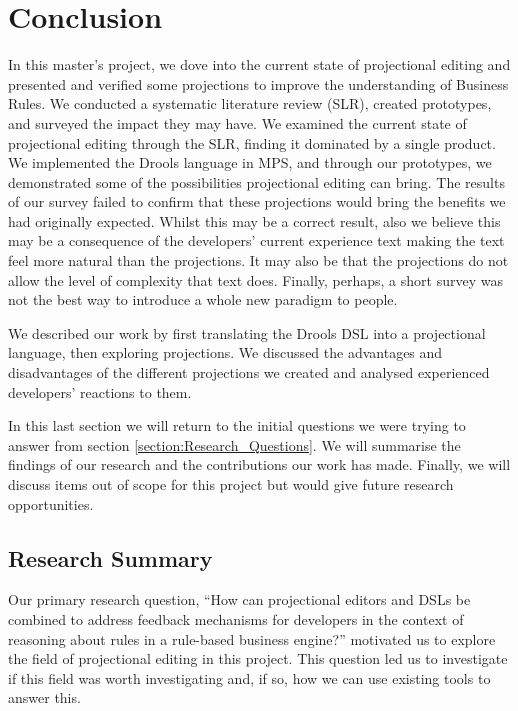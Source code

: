 \chapter{Conclusion}
\label{chapter:Conclusion}

In this master's project, we dove into the current state of projectional editing and presented and verified some projections to improve the understanding of Business Rules.
We conducted a systematic literature review (SLR), created prototypes, and surveyed the impact they may have.
We examined the current state of projectional editing through the SLR, finding it dominated by a single product.
We implemented the Drools language in MPS, and through our prototypes, we demonstrated some of the possibilities projectional editing can bring.
The results of our survey failed to confirm that these projections would bring the benefits we had originally expected.
Whilst this may be a correct result, also we believe this may be a consequence of the developers' current experience text making the text feel more natural than the projections.
It may also be that the projections do not allow the level of complexity that text does.
Finally, perhaps, a short survey was not the best way to introduce a whole new paradigm to people.  

We described our work by first translating the Drools DSL into a projectional language, then exploring projections.
We discussed the advantages and disadvantages of the different projections we created and analysed experienced developers' reactions to them.

In this last section we will return to the initial questions we were trying to answer from section \ref{section:Research_Questions}.
We will summarise the findings of our research and the contributions our work has made.
Finally, we will discuss items out of scope for this project but would give future research opportunities.

\section{Research Summary}
Our primary research question, ``How can projectional editors and DSLs be combined to address feedback mechanisms for developers in the context of reasoning about rules in a rule-based business engine?'' motivated us to explore the field of projectional editing in this project.
This question led us to investigate if this field was worth investigating and, if so, how we can use existing tools to answer this.

